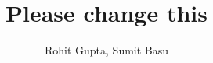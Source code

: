 \documentclass[a4paper]{article}
\begin{document}
\title{Please change this}
\author{Rohit Gupta, Sumit Basu}
\maketitle
\end{document}
